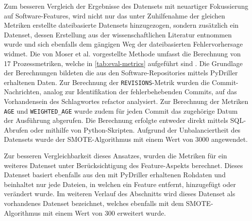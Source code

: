 Zum besseren Vergleich der Ergebnisse des Datensets mit neuartiger Fokussierung auf Software-Features, wird nicht nur das unter Zuhilfenahme der gleichen Metriken erstellte dateibasierte Datensets hinzugezogen, sondern zusätzlich ein Datenset, dessen Erstellung aus der wissenschaftlichen Literatur entnommen wurde und sich ebenfalls dem gängigen Weg der dateibasierten Fehlervorhersage widmet. Die von Moser et al. vorgestellte Methode umfasst die Berechnung von 17 Prozessmetriken, welche in \autoref{tab:eval-metrics} aufgeführt sind \cite{Moser2008}. Die Grundlage der Berechnungen bildeten die aus den Software-Repositories mittels PyDriller erhaltenen Daten. Zur Berechnung der \texttt{REVISIONS}-Metrik wurden die Commit-Nachrichten, analog zur Identifikation der fehlerbehebenden Commits, auf das Vorhandensein des Schlagwortes \glqq refactor\grqq{} analysiert. Zur Berechnung der Metriken \texttt{AGE} und \texttt{WEIGHTED\_AGE} wurde zudem für jeden Commit das zugehörige Datum der Ausführung abgerufen. Die Berechnung erfolgte entweder direkt mittels SQL-Abrufen oder mithilfe von Python-Skripten. Aufgrund der Unbalanciertheit des Datensets wurde der SMOTE-Algorithmus mit einem Wert von 3000 angewendet.

Zur besseren Vergleichbarkeit dieses Ansatzes, wurden die Metriken für ein weiteres Datenset unter Berücksichtigung des Feature-Aspekts berechnet. Dieses Datenset basiert ebenfalls aus den mit PyDriller erhaltenen Rohdaten und beinhaltet nur jede Dateien, in welchen ein Feature entfernt, hinzugefügt oder verändert wurde. Im weiteren Verlauf des Abschnitts wird dieses Datenset als \glqq vorhandenes Datenset\grqq{} bezeichnet, welches ebenfalls mit dem SMOTE-Algorithmus mit einem Wert von 300 erweitert wurde.

